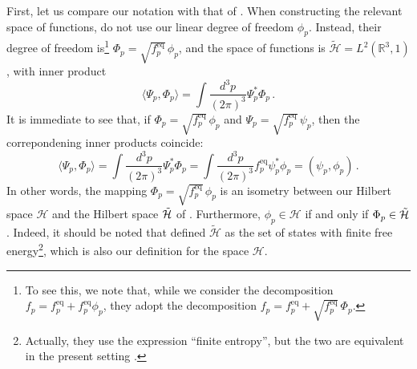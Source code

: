 \documentclass[a4paper, amsfonts, amssymb, amsmath, reprint, showkeys, nofootinbib, twoside, onecolumn,notitlepage,,longbibliography]{revtex4-2}
\theoremstyle{definition}
\theoremstyle{theorem}
\theoremstyle{corollary}
\begin{document}
First, let us compare our notation with that of \cite{Dudynski1988}. When constructing the relevant space of functions, \citet{Dudynski1988} do not use our linear degree of freedom $\phi_p$. Instead, their degree of freedom is\footnote{To see this, we note that, while we consider the decomposition $f_p=f^{\text{eq}}_p{+}f^{\text{eq}}_p \phi_p$, they adopt the decomposition $f_p=f^{\text{eq}}_p{+}\sqrt{f^{\text{eq}}_p} \,  \Phi_p$.} $\Phi_p=\sqrt{f^{\text{eq}}_p} \, \phi_p$, and the space of functions is $\tilde{\mathcal{H}}=L^2(\mathbb{R}^3,1)$, with inner product
\begin{equation}
    \langle \Psi_p,\Phi_p \rangle = \int \dfrac{d^3 p}{(2\pi)^3} \Psi^*_p \Phi_p \, . 
\end{equation}
It is immediate to see that, if $\Phi_p=\sqrt{f^{\text{eq}}_p} \, \phi_p$ and $\Psi_p=\sqrt{f^{\text{eq}}_p} \, \psi_p$, then the correpondening inner products coincide: 
\begin{equation}
    \langle \Psi_p,\Phi_p \rangle = \int \dfrac{d^3 p}{(2\pi)^3} \Psi^*_p \Phi_p = \int \dfrac{d^3 p}{(2\pi)^3} f^{\text{eq}}_p \psi^*_p \phi_p = (\psi_p,\phi_p)\, . 
\end{equation}
In other words, the mapping $\Phi_p=\sqrt{f^{\text{eq}}_p} \, \phi_p$ is an isometry between our Hilbert space $\mathcal{H}$ and the Hilbert space $\Tilde{\mathcal{H}}$ of \cite{Dudynski1988}. Furthermore, $\phi_p \in \mathcal{H}$ if and only if $\Phi_p \in \Tilde{\mathcal{H}}$. Indeed, it should be noted that \citet{Dudynski1988} defined $\tilde{\mathcal{H}}$ as the set of states with finite free energy\footnote{Actually, they use the expression ``finite entropy'', but the two are equivalent in the present setting \cite{GavassinoCausality2021}.}, which is also our definition for the space $\mathcal{H}$. 
\end{document}
